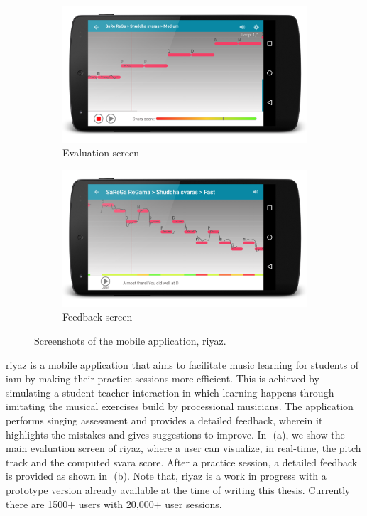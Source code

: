 \begin{figure}
	\begin{subfigure}{\textwidth}
			\centering
		\includegraphics[width=\figSizeSeventy]{ch08_applications/figures/riyaz1.png}
		\caption{Evaluation screen}
		\label{fig:riyaz_evaluation_screen}
	\end{subfigure}
	\begin{subfigure}{\textwidth}
			\centering
		\includegraphics[width=\figSizeSeventy]{ch08_applications/figures/riyaz2.png}
		\caption{Feedback screen}
		\label{fig:riyaz_feedback_screen}
	\end{subfigure}
	\caption{Screenshots of the mobile application, \gls{riyaz}.}
	\label{fig:riyaz_screens}
\end{figure}

\gls{riyaz} is a mobile application that aims to facilitate music learning for students of \gls{iam} by making their practice sessions more efficient. This is achieved by simulating a student-teacher interaction in which learning happens through imitating the musical exercises build by processional musicians. The application performs singing assessment and provides a detailed feedback, wherein it highlights the mistakes and gives suggestions to improve. In~\,(a), we show the main evaluation screen of \gls{riyaz}, where a user can visualize, in real-time, the pitch track and the computed \gls{svara} score. After a practice session, a detailed feedback is provided as shown in~\,(b). Note that, \gls{riyaz} is a work in progress with a prototype version already available at the time of writing this thesis. Currently there are 1500+ users with 20,000+ user sessions. 


